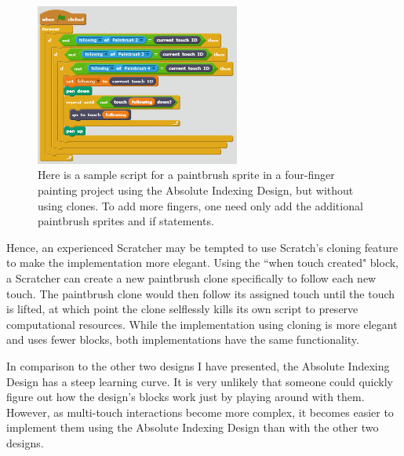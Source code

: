 \begin{figure}
\centering
\includegraphics[width=0.6\textwidth]{images/TediousMultiFingerPainting.PNG}
\caption[Sample Absolute Indexing Design Script For Multi-Finger Painting Without Using Clones]
{Here is a sample script for a paintbrush sprite in a four-finger painting project using the Absolute Indexing Design, but without using clones. To add more fingers, one need only add the additional paintbrush sprites and if statements.}
\label{TediousMultiFingerPainting}
\end{figure}

Hence, an experienced Scratcher may be tempted to use Scratch's cloning feature to make the implementation more elegant. Using the ``when touch created" block, a Scratcher can create a new paintbrush clone specifically to follow each new touch. The paintbrush clone would then follow its assigned touch until the touch is lifted, at which point the clone selflessly kills its own script to preserve computational resources. While the implementation using cloning is more elegant and uses fewer blocks, both implementations have the same functionality.

In comparison to the other two designs I have presented, the Absolute Indexing Design has a steep learning curve. It is very unlikely that someone could quickly figure out how the design's blocks work just by playing around with them. However, as multi-touch interactions become more complex, it becomes easier to implement them using the Absolute Indexing Design than with the other two designs.  

